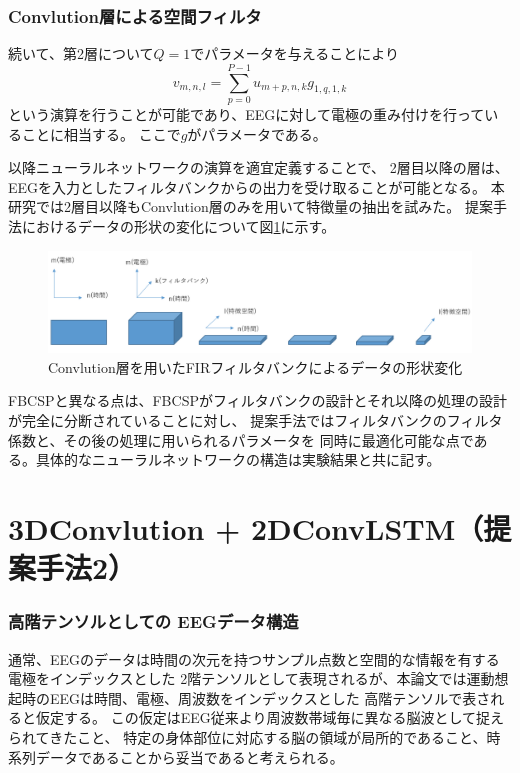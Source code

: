 \subsubsection{\rm Convlution\mc 層による空間フィルタ}
続いて、第2層について\(Q=1\)でパラメータを与えることにより
\begin{equation}
    v_{m,n,l} = \sum_{p=0}^{P-1} u_{m+p,n,k} g_{1,q,1,k}
    \label{eq:pseudoFIR}
\end{equation} 
という演算を行うことが可能であり、EEGに対して電極の重み付けを行っていることに相当する。
ここで\(g\)がパラメータである。

以降ニューラルネットワークの演算を適宜定義することで、
2層目以降の層は、EEGを入力としたフィルタバンクからの出力を受け取ることが可能となる。
本研究では2層目以降もConvlution層のみを用いて特徴量の抽出を試みた。
提案手法におけるデータの形状の変化について図\ref{fig:pseudFBCSP}に示す。
\begin{figure}[t]
    \centering
    \includegraphics[width=13cm]{images/pseudFBCSP.png}
    \caption{Convlution層を用いたFIRフィルタバンクによるデータの形状変化}
    \label{fig:pseudFBCSP}
\end{figure}
FBCSPと異なる点は、FBCSPがフィルタバンクの設計とそれ以降の処理の設計が完全に分断されていることに対し、
提案手法ではフィルタバンクのフィルタ係数と、その後の処理に用いられるパラメータを
同時に最適化可能な点である。具体的なニューラルネットワークの構造は実験結果と共に記す。


\section{\rm 3DConvlution + 2DConvLSTM\mc （提案手法2）}
\subsubsection{\mc 高階テンソルとしての \rm EEG\mc データ構造}
通常、EEGのデータは時間の次元を持つサンプル点数と空間的な情報を有する電極をインデックスとした
2階テンソルとして表現されるが、本論文では運動想起時のEEGは時間、電極、周波数をインデックスとした
高階テンソルで表されると仮定する。
この仮定はEEG従来より周波数帯域毎に異なる脳波として捉えられてきたこと、
特定の身体部位に対応する脳の領域が局所的であること、時系列データであることから妥当であると考えられる。

